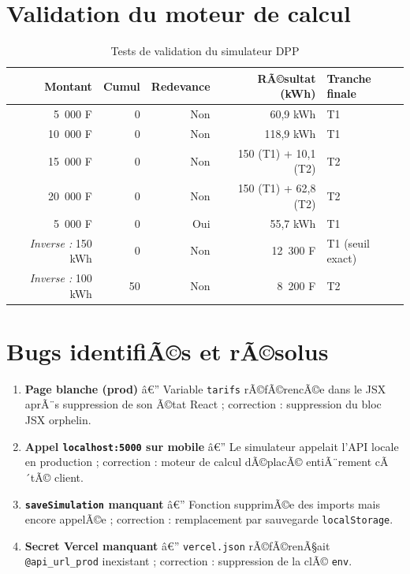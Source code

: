 \documentclass[12pt,a4paper]{report}
\begin{document}
\section{Validation du moteur de calcul}

\begin{table}[h!]
\centering
\caption{Tests de validation du simulateur DPP}
\label{tab:tests}
\begin{tabularx}{\textwidth}{r r r r X}
\toprule
\rowcolor{marine!10}
Montant & Cumul & Redevance & RÃ©sultat (kWh) & Tranche finale \\
\midrule
5~000 F  & 0 & Non & 60,9 kWh              & T1 \\
10~000 F & 0 & Non & 118,9 kWh             & T1 \\
15~000 F & 0 & Non & 150 (T1) + 10,1 (T2) & T2 \\
20~000 F & 0 & Non & 150 (T1) + 62,8 (T2) & T2 \\
5~000 F  & 0 & Oui & 55,7 kWh              & T1 \\
\midrule
\textit{Inverse :} 150 kWh & 0  & Non & 12~300 F & T1 (seuil exact) \\
\textit{Inverse :} 100 kWh & 50 & Non & 8~200 F  & T2 \\
\bottomrule
\end{tabularx}
\end{table}

\section{Bugs identifiÃ©s et rÃ©solus}

\begin{infobox}
\begin{enumerate}
  \item \textbf{Page blanche (prod)} â€” Variable \texttt{tarifs} rÃ©fÃ©rencÃ©e dans le JSX aprÃ¨s suppression de son Ã©tat React ; correction : suppression du bloc JSX orphelin.
  \item \textbf{Appel \texttt{localhost:5000} sur mobile} â€” Le simulateur appelait l'API locale en production ; correction : moteur de calcul dÃ©placÃ© entiÃ¨rement cÃ´tÃ© client.
  \item \textbf{\texttt{saveSimulation} manquant} â€” Fonction supprimÃ©e des imports mais encore appelÃ©e ; correction : remplacement par sauvegarde \texttt{localStorage}.
  \item \textbf{Secret Vercel manquant} â€” \texttt{vercel.json} rÃ©fÃ©renÃ§ait \texttt{@api\_url\_prod} inexistant ; correction : suppression de la clÃ© \texttt{env}.
\end{enumerate}
\end{infobox}
\end{document}

